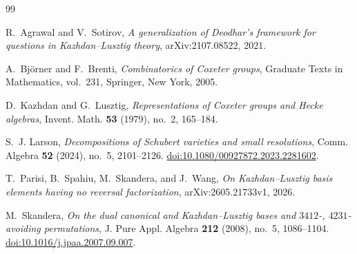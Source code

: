 \documentclass[11pt]{amsart}
\theoremstyle{remark}
\begin{document}
{\small
\begin{thebibliography}{99}

R.~Agrawal and V.~Sotirov,
\emph{A generalization of Deodhar's framework for questions in
Kazhdan--Lusztig theory},
arXiv:2107.08522, 2021.

A.~Bj\"orner and F.~Brenti,
\emph{Combinatorics of Coxeter groups},
Graduate Texts in Mathematics, vol.~231, Springer, New York, 2005.

D.~Kazhdan and G.~Lusztig,
\emph{Representations of Coxeter groups and Hecke algebras},
Invent. Math. \textbf{53} (1979), no.~2, 165--184.

S.~J. Larson,
\emph{Decompositions of Schubert varieties and small resolutions},
Comm. Algebra \textbf{52} (2024), no.~5, 2101--2126.
\href{https://doi.org/10.1080/00927872.2023.2281602}
{doi:10.1080/00927872.2023.2281602}.

T.~Parisi, B.~Spahiu, M.~Skandera, and J.~Wang,
\emph{On Kazhdan--Lusztig basis elements having no reversal
factorization},
arXiv:2605.21733v1, 2026.

M.~Skandera,
\emph{On the dual canonical and Kazhdan--Lusztig bases and
$3412$-, $4231$-avoiding permutations},
J. Pure Appl. Algebra \textbf{212} (2008), no.~5, 1086--1104.
\href{https://doi.org/10.1016/j.jpaa.2007.09.007}
{doi:10.1016/j.jpaa.2007.09.007}.

\end{thebibliography}
}
\end{document}
